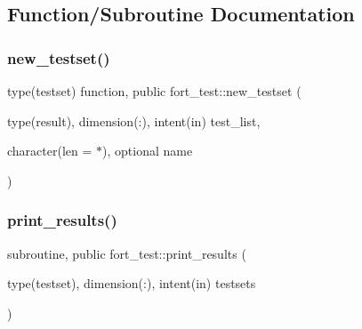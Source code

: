 \subsection{Function/\+Subroutine Documentation}
\mbox{\label{namespacefort__test_ac1b02a037c4855a5530ae89a6e70cace}} 
\subsubsection{\texorpdfstring{new\+\_\+testset()}{new\_testset()}}
{\footnotesize\ttfamily type(testset) function, public fort\+\_\+test\+::new\+\_\+testset (\begin{DoxyParamCaption}\item[{type(result), dimension(\+:), intent(in)}]{test\+\_\+list,  }\item[{character(len = $\ast$), optional}]{name }\end{DoxyParamCaption})}

\mbox{\label{namespacefort__test_ab48fbb70a5c3df67c8965725d8a6f8e2}} 
\subsubsection{\texorpdfstring{print\+\_\+results()}{print\_results()}}
{\footnotesize\ttfamily subroutine, public fort\+\_\+test\+::print\+\_\+results (\begin{DoxyParamCaption}\item[{type(testset), dimension(\+:), intent(in)}]{testsets }\end{DoxyParamCaption})}

